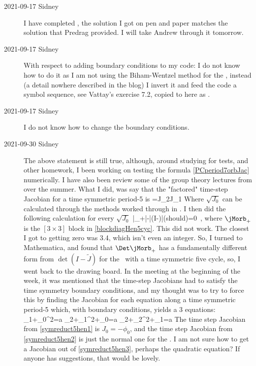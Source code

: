 \begin{description}
\item[2021-09-17 Sidney]
I have completed , the solution I got on pen
and paper matches the solution that Predrag provided. I will take Andrew
through it tomorrow.

\item[2021-09-17 Sidney]
With respect to adding boundary conditions to my code: I do not know how
to do it as I am not using the Biham-Wentzel method for the \henlatt,
instead (a detail nowhere described in the blog) I invert it  and feed
the code a symbol sequence, see Vattay's  {exercise
7.2}, copied to here as .

\item[2021-09-17 Sidney]
I do not know how to
change the boundary conditions.

\item[2021-09-30 Sidney]
The above statement is still true, although, around studying for tests,
and other homework, I been working on testing the formula
\eqref{PCperiod7orbJac} numerically. I have also been review some of the
group theory lectures from over the summer. What I did, was say that the
"factored" time-step Jacobian for a time symmetric period-5 is
\beq
	=J_2J_1
Where $\sqrt{J_0}$ can be calculated through the methods worked through in . I then did the following calculation for every $\sqrt{J_0}$
\beq
	|\Det\jMorb_+|-|\det(I-)|(should)=0
\,,
where $\jMorb_+$ is the $[3\times3]$ block in \eqref{blockdiagHen5cyc}.
This did not work. The closest I got to getting zero was 3.4, which isn't
even an integer. So, I turned to Mathematica, and found that
$\Det\jMorb_+$ has a fundamentally different form from $\det(I-\tilde{J})$
for the \henlatt\ with a time symmetric five cycle, so, I went back to the
drawing board. In the meeting at the beginning of the week, it was
mentioned that the time-step Jacobians had to satisfy the time symmetry
boundary conditions, and my thought was to try to force this by finding
the Jacobian for each equation along a time symmetric period-5 which, with
boundary conditions, yields a 3 equations:
\phi_1+\phi_0^2=a
\beq
	\phi_2+\phi_1^2+\phi_0=a
\beq
	\phi_2+\phi_2^2+\phi_1=a
The time step Jacobian from \eqref{symreduct5hen1} is $J_0=-\phi_0$, and
the time step Jacobian from \eqref{symreduct5hen2} is just the normal one
for the \henlatt. I am not sure how to get a Jacobian out of
\eqref{symreduct5hen3}, perhaps the quadratic equation? If anyone has
suggestions, that would be lovely.


\end{description}
